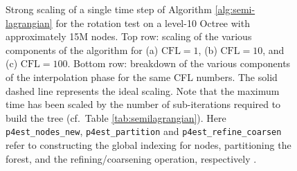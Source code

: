 \begin{figure}[htbp]
\begin{center}
	\end{center}
	\caption{Strong scaling of a single time step of Algorithm \ref{alg:semi-lagrangian} for the rotation test on a level-10 Octree with approximately 15M nodes. Top row: scaling of the various components of the algorithm for (a) $\text{CFL} = 1$, (b) $\text{CFL} = 10$, and (c) $\text{CFL} = 100$. Bottom row: breakdown of the various components of the interpolation phase for the same CFL numbers. The solid dashed line represents the ideal scaling. Note that the maximum time has been scaled by the number of sub-iterations required to build the tree (cf.\ Table \ref{tab:semilagrangian}). Here \texttt{p4est\_nodes\_new}, \texttt{p4est\_partition} and \texttt{p4est\_refine\_coarsen} refer to constructing the global indexing for nodes, partitioning the forest, and the refining/coarsening operation, respectively \cite{Burstedde;Wilcox;Ghattas:11:p4est:-Scalable-Algo}.}
	\label{fig:semilagrangian_small}
\end{figure}


